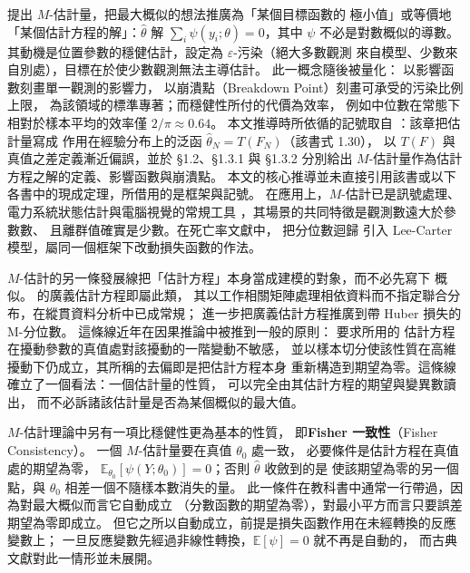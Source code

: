 \documentclass[UTF8, fontset=macnew, a4paper, 12pt]{ctexart}
\newcommand{\Ex}{\mathbb{E}}
\begin{document}
\citet{huber1964} 提出 $M$-估計量，把最大概似的想法推廣為「某個目標函數的
極小值」或等價地「某個估計方程的解」：$\hat\theta$ 解
$\sum_i\psi(y_i;\theta)=0$，其中 $\psi$ 不必是對數概似的導數。
其動機是位置參數的穩健估計，設定為 $\varepsilon$-污染（絕大多數觀測
來自模型、少數來自別處），目標在於使少數觀測無法主導估計。
此一概念隨後被量化：\citet{hampel1974} 以影響函數刻畫單一觀測的影響力，
\citet{donoho1983} 以崩潰點（Breakdown Point）刻畫可承受的污染比例上限，
\citet{huber2009} 為該領域的標準專著；而穩健性所付的代價為效率，
例如中位數在常態下相對於樣本平均的效率僅 $2/\pi\approx0.64$。
本文推導時所依循的記號取自 \citet[第 1 章]{zoubir2018}：該章把估計量寫成
作用在經驗分布上的泛函 $\hat\theta_N=T(F_N)$（該書式 1.30），
以 $T(F)$ 與真值之差定義漸近偏誤，並於 §1.2、§1.3.1 與 §1.3.2 分別給出
$M$-估計量作為估計方程之解的定義、影響函數與崩潰點。
本文的核心推導並未直接引用該書或以下各書中的現成定理，所借用的是框架與記號。
在應用上，$M$-估計已是訊號處理、電力系統狀態估計與電腦視覺的常規工具
\citep{zoubir2018}，其場景的共同特徵是觀測數遠大於參數數、
且離群值確實是少數。在死亡率文獻中，\citet{santolino2020} 把分位數迴歸
引入 Lee-Carter 模型，屬同一個框架下改動損失函數的作法。

$M$-估計的另一條發展線把「估計方程」本身當成建模的對象，而不必先寫下
概似。\citet{liang1986} 的廣義估計方程即屬此類，
其以工作相關矩陣處理相依資料而不指定聯合分布，在縱貫資料分析中已成常規；
\citet{merlo2022} 進一步把廣義估計方程推廣到帶 Huber 損失的 M-分位數。
這條線近年在因果推論中被推到一般的原則：\citet{chernozhukov2018} 要求所用的
估計方程在擾動參數的真值處對該擾動的一階變動不敏感，
並以樣本切分使該性質在高維擾動下仍成立，其所稱的去偏即是把估計方程本身
重新構造到期望為零。這條線確立了一個看法：一個估計量的性質，
可以完全由其估計方程的期望與變異數讀出，
而不必訴諸該估計量是否為某個概似的最大值。

$M$-估計理論中另有一項比穩健性更為基本的性質，
即\textbf{Fisher 一致性}（Fisher Consistency）。
一個 $M$-估計量要在真值 $\theta_0$ 處一致，
必要條件是估計方程在真值處的期望為零，
$\Ex_{\theta_0}[\psi(Y;\theta_0)]=0$；否則 $\hat\theta$ 收斂到的是
使該期望為零的另一個點，與 $\theta_0$ 相差一個不隨樣本數消失的量。
此一條件在教科書中通常一行帶過，因為對最大概似而言它自動成立
（分數函數的期望為零），對最小平方而言只要誤差期望為零即成立。
但它之所以自動成立，前提是損失函數作用在未經轉換的反應變數上；
一旦反應變數先經過非線性轉換，$\Ex[\psi]=0$ 就不再是自動的，
而古典文獻對此一情形並未展開。
\end{document}
